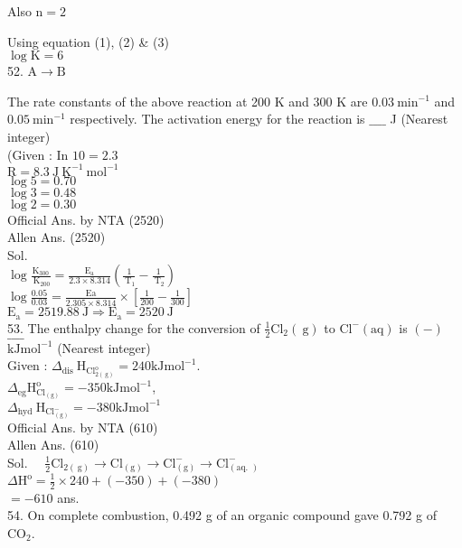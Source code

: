 \documentclass[10pt]{article}
\begin{document}
Also \(\mathrm{n}=2\)

Using equation (1), (2) \& (3)\\
\(\log \mathrm{K}=6\)\\
52. \(\mathrm{A} \rightarrow \mathrm{B}\)

The rate constants of the above reaction at 200 K and 300 K are \(0.03 \mathrm{~min}^{-1}\) and \(0.05 \mathrm{~min}^{-1}\) respectively. The activation energy for the reaction is \(\_\_\_\_\) J (Nearest integer)\\
(Given : In \(10=2.3\)\\
\(\mathrm{R}=8.3 \mathrm{~J} \mathrm{~K}^{-1} \mathrm{~mol}^{-1}\)\\
\(\log 5=0.70\)\\
\(\log 3=0.48\)\\
\(\log 2=0.30\)\\
Official Ans. by NTA (2520)\\
Allen Ans. (2520)\\
Sol.\\
\(\log \frac{\mathrm{K}_{300}}{\mathrm{~K}_{200}}=\frac{\mathrm{E}_{\mathrm{a}}}{2.3 \times 8.314}\left(\frac{1}{\mathrm{~T}_{1}}-\frac{1}{\mathrm{~T}_{2}}\right)\)\\
\(\log \frac{0.05}{0.03}=\frac{\mathrm{Ea}}{2.305 \times 8.314} \times\left[\frac{1}{200}-\frac{1}{300}\right]\)\\
\(\mathrm{E}_{\mathrm{a}}=2519.88 \mathrm{~J} \Rightarrow \mathrm{E}_{\mathrm{a}}=2520 \mathrm{~J}\)\\
53. The enthalpy change for the conversion of \(\frac{1}{2} \mathrm{Cl}_{2}(\mathrm{~g})\) to \(\mathrm{Cl}^{-}(\mathrm{aq})\) is \((-)\) \(\_\_\_\_\)\\
\(\mathrm{kJ} \mathrm{mol}^{-1}\) (Nearest integer)\\
Given : \(\Delta_{\text {dis }} \mathrm{H}_{\mathrm{Cl}_{2(\mathrm{~g})}^{\mathrm{o}}}=240 \mathrm{kJmol}^{-1}\).\\
\(\Delta_{\mathrm{eg}} \mathrm{H}_{\mathrm{Cl}_{(\mathrm{g})}}^{\mathrm{o}}=-350 \mathrm{kJmol}^{-1}\),\\
\(\Delta_{\text {hyd }} \mathrm{H}_{\mathrm{Cl}_{(\mathrm{g})}^{-}}=-380 \mathrm{kJmol}^{-1}\)\\
Official Ans. by NTA (610)\\
Allen Ans. (610)\\
Sol. \(\quad \frac{1}{2} \mathrm{Cl}_{2(\mathrm{~g})} \rightarrow \mathrm{Cl}_{(\mathrm{g})} \rightarrow \mathrm{Cl}_{(\mathrm{g})}^{-} \rightarrow \mathrm{Cl}_{(\text {aq. })}^{-}\)\\
\(\Delta \mathrm{H}^{\mathrm{o}}=\frac{1}{2} \times 240+(-350)+(-380)\)\\
\(=-610\) ans.\\
54. On complete combustion, 0.492 g of an organic compound gave 0.792 g of \(\mathrm{CO}_{2}\).
\end{document}
